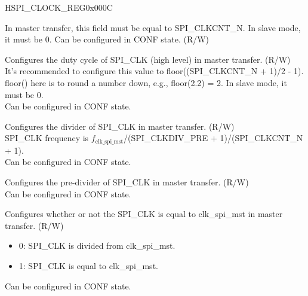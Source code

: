 \begin{register}{H}{SPI\_CLOCK\_REG}{0x000C}\label{regdesc:SPICLOCKREG}
%
%
%
%
%
%
\regnewline%
\begin{regdesc}\begin{reglist}
\label{fielddesc:SPICLKCNTL}\item [SPI\_CLKCNT\_L] In master transfer, this field must be equal to SPI\_CLKCNT\_N. In slave mode, it must be 0. Can be configured in CONF state. (R/W)
\label{fielddesc:SPICLKCNTH}\item [SPI\_CLKCNT\_H] Configures the duty cycle of SPI\_CLK (high level) in master transfer. (R/W)\\
It's recommended to configure this value to floor((SPI\_CLKCNT\_N + 1)/2 - 1). floor() here is to round a number down, e.g., floor(2.2) = 2. In slave mode, it must be 0. \\
Can be configured in CONF state.
\label{fielddesc:SPICLKCNTN}\item [SPI\_CLKCNT\_N] Configures the divider of SPI\_CLK in master transfer. (R/W)\\
SPI\_CLK frequency is $f_{\textrm{clk\_spi\_mst}}$/(SPI\_CLKDIV\_PRE + 1)/(SPI\_CLKCNT\_N + 1). \\
Can be configured in CONF state. 
\label{fielddesc:SPICLKDIVPRE}\item [SPI\_CLKDIV\_PRE] Configures the pre-divider of SPI\_CLK in master transfer. (R/W)\\
Can be configured in CONF state. 
\label{fielddesc:SPICLKEQUSYSCLK}\item [SPI\_CLK\_EQU\_SYSCLK] Configures whether or not the SPI\_CLK is equal to clk\_spi\_mst in master transfer. (R/W)\\
\begin{itemize}
    \item 0: SPI\_CLK is divided from clk\_spi\_mst.
    \item 1: SPI\_CLK is equal to clk\_spi\_mst.
\end{itemize}
Can be configured in CONF state.
\end{reglist}\end{regdesc}
\end{register}


